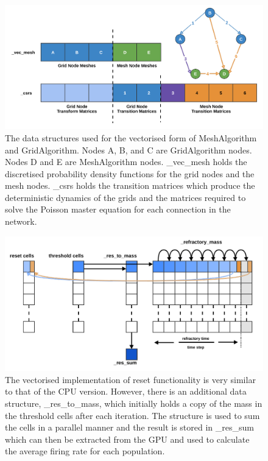 \documentclass[utf8]{frontiers_suppmat} %
\begin{document}
\begin{figure}[!h]
  \centering
  \includegraphics[width=\columnwidth]{images/neuroinformatics_structure.pdf}
  \caption{The data structures used for the vectorised form of MeshAlgorithm and GridAlgorithm. Nodes A, B, and C are GridAlgorithm nodes. Nodes D and E are MeshAlgorithm nodes. \_vec\_mesh holds the discretised probability density functions for the grid nodes and the mesh nodes. \_csrs holds the transition matrices which produce the deterministic dynamics of the grids and the matrices required to solve the Poisson master equation for each connection in the network. }
  \label{fig:cudastruct}
\end{figure}

\begin{figure}[!h]
  \centering
  \includegraphics[width=\columnwidth]{images/neuroinformatics_reset.pdf}
  \caption{The vectorised implementation of reset functionality is very similar to that of the CPU version. However, there is an additional data structure, \_res\_to\_mass, which initially holds a copy of the mass in the threshold cells after each iteration. The structure is used to sum the cells in a parallel manner and the result is stored in \_res\_sum which can then be extracted from the GPU and used to calculate the average firing rate for each population.}
  \label{fig:cudareset}
\end{figure}
\end{document}
